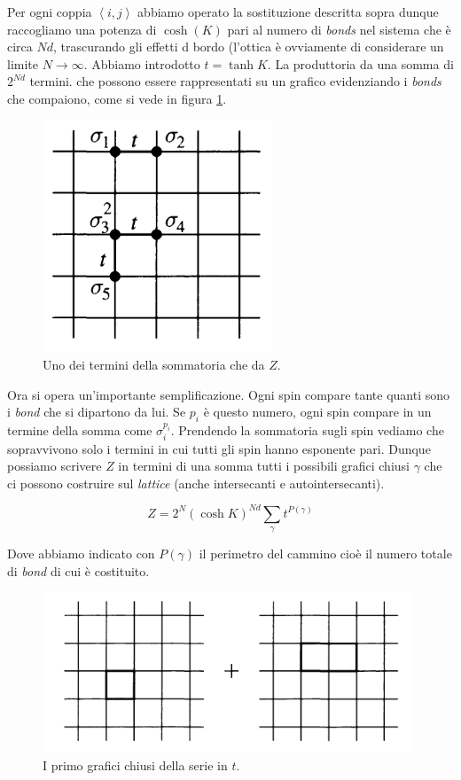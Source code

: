\documentclass[12pt,a4paper]{article}
\begin{document}
Per ogni coppia $\left< i, j \right>$ abbiamo operato la sostituzione descritta sopra dunque raccogliamo una potenza di $\cosh (K)$ pari al numero di \emph{bonds} nel sistema che è circa $Nd$, trascurando gli effetti d bordo (l'ottica è ovviamente di considerare un limite $N \rightarrow \infty$. Abbiamo introdotto $t = \tanh K$. La produttoria da una somma di $2^{Nd}$ termini. che possono essere rappresentati su un grafico evidenziando i \emph{bonds} che compaiono, come si vede in figura \ref{fig:low}.

\begin{figure}[!htb]
\centering
\includegraphics[scale=0.70]{low.png}
\caption{Uno dei termini della sommatoria che da $Z$.\label{fig:low}}
\end{figure}

Ora si opera un'importante semplificazione. Ogni spin compare tante quanti sono i \emph{bond} che si dipartono da lui. Se $p_i$ è questo numero, ogni spin compare in un termine della somma come $\sigma_i ^{p_i}$. Prendendo la sommatoria sugli spin vediamo che sopravvivono solo i termini in cui tutti gli spin hanno esponente pari. Dunque possiamo scrivere $Z$ in termini di una somma tutti i possibili grafici chiusi $\gamma$ che ci possono costruire sul \emph{lattice} (anche intersecanti e autointersecanti).

\begin{equation}
Z = 2^{N} \left( \cosh K \right) ^{N d} \sum_{\gamma} t^{ P(\gamma)} 
\end{equation}

Dove abbiamo indicato con $P(\gamma)$ il perimetro del cammino cioè il numero totale di \emph{bond} di cui è costituito.

\begin{figure}[!htb]
\centering
\includegraphics[scale=0.70]{high.png}
\caption{I primo grafici chiusi della serie in $t$.\label{fig:high}}
\end{figure}
\end{document}
